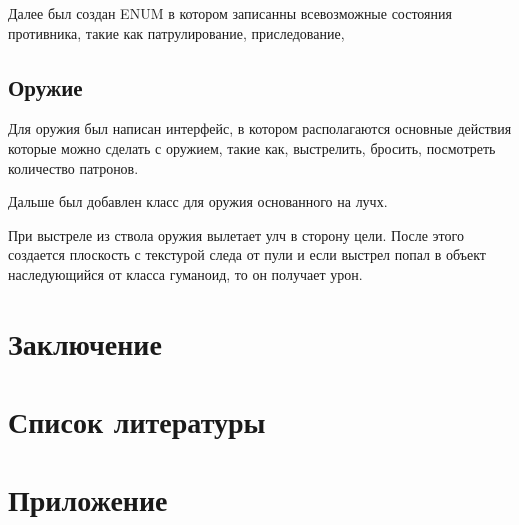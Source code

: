 \documentclass[14pt, titlepage,fleqn,a4paper]{extarticle}
\begin{document}
Далее был создан ENUM в котором записанны всевозможные состояния противника, такие как патрулирование, приследование, 

    \subsection*{Оружие}
	
	Для оружия был написан интерфейс, в котором располагаются основные действия которые можно сделать с оружием, такие как, выстрелить, бросить, посмотреть количество патронов.
	
	Дальше был добавлен класс для оружия основанного на лучх.
	
	При выстреле из ствола оружия вылетает улч в сторону цели. После этого создается плоскость с текстурой следа от пули и если выстрел попал в объект наследующийся от класса гуманоид, то он получает урон.
	
	\section*{Заключение}
	
	\section*{Список литературы}
	
	\newpage
	\section*{Приложение}
	
\end{document}
